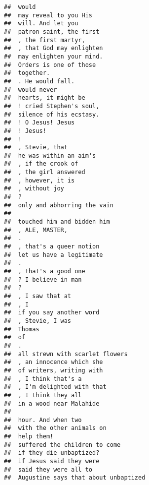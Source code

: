 \documentclass[]{article}
\begin{document}
\begin{verbatim}
##  would                                   
##  may reveal to you His                   
##  will. And let you                       
##  patron saint, the first                 
##  , the first martyr,                     
##  , that God may enlighten                
##  may enlighten your mind.                
##  Orders is one of those                  
##  together.                               
##  . He would fall.                        
##  would never                             
##  hearts, it might be                     
##  ! cried Stephen's soul,                 
##  silence of his ecstasy.                 
##  ! O Jesus! Jesus                        
##  ! Jesus!                                
##  !                                       
##  , Stevie, that                          
##  he was within an aim's                  
##  , if the crook of                       
##  , the girl answered                     
##  , however, it is                        
##  , without joy                           
##  ?                                       
##  only and abhorring the vain             
##                                          
##  touched him and bidden him              
##  , ALE, MASTER,                          
##  .                                       
##  , that's a queer notion                 
##  let us have a legitimate                
##  .                                       
##  , that's a good one                     
##  ? I believe in man                      
##  ?                                       
##  , I saw that at                         
##  , I                                     
##  if you say another word                 
##  , Stevie, I was                         
##  Thomas                                  
##  of                                      
##  .                                       
##  all strewn with scarlet flowers         
##  , an innocence which she                
##  of writers, writing with                
##  , I think that's a                      
##  , I'm delighted with that               
##  , I think they all                      
##  in a wood near Malahide                 
##                                          
##  hour. And when two                      
##  with the other animals on               
##  help them!                              
##  suffered the children to come           
##  if they die unbaptized?                 
##  if Jesus said they were                 
##  said they were all to                   
##  Augustine says that about unbaptized    

\end{verbatim}
\end{document}
